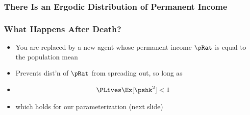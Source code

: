 \documentclass{beamer}
\newcommand{\jemph}[1]{{\color{jirkasred}#1}}
\begin{document}
\subsubsection{There Is an Ergodic Distribution of Permanent Income}
\begin{frame}
\frametitle{{What Happens After Death?}}

\pause
\begin{itemize}
\item You are replaced by a new agent whose permanent income $\pRat$ is equal to the population mean
\item Prevents dist'n of $\pRat$ from spreading out, so long as
\item[] $$\PLives \Ex[\pshk^{2}] < 1$$
\item[] which holds for our parameterization (next slide)
\end{itemize}
\end{frame}


%
%
%
\end{document}
